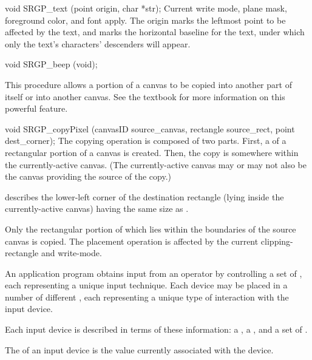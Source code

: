 \nextsynopsis
void SRGP_text (point origin, char *str);
\endsynopsis
Current write mode, plane mask, foreground color, and font apply.  The origin
marks the leftmost point to be affected by the text, and marks the horizontal
baseline for the text, under which only the text's characters' descenders will
appear.






\newsynopsis
void SRGP_beep (void);
\endsynopsis



This procedure allows a portion of a canvas to be copied into another
part of itself or into another canvas.  See the textbook for more
information on this powerful feature.


\newsynopsis
void SRGP_copyPixel (canvasID source_canvas, rectangle source_rect, 
                     point dest_corner);
\endsynopsis
The copying operation is composed of two parts.  First, a  of a
rectangular portion of a canvas is created.  Then, the copy is 
somewhere within the currently-active canvas.  (The currently-active canvas may
or may not also be the canvas providing the source of the copy.)

\indentpar
{} describes the lower-left corner of
the destination rectangle (lying inside the currently-active canvas) having the
same size as .

\indentpar
Only the rectangular portion of  which lies within the
boundaries of the source canvas is copied.  The placement
operation is affected by the current clipping-rectangle and write-mode.


An application program obtains input from an operator by controlling
a set of , each representing a unique
input technique.  Each device may be placed in a number of different
, each representing a unique type of interaction
with the input device.


Each input device is described in terms of these
information:
a , a , and a set of .

\newpar
The  of an input device is the value currently associated
with the device.

